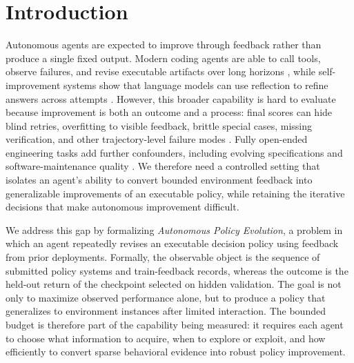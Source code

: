 \section{Introduction}
Autonomous agents are expected to improve through feedback rather than produce a single fixed output. Modern coding agents are able to call tools, observe failures, and revise executable artifacts over long horizons \citep{sweagent,openhands,codeact}, while self-improvement systems show that language models can use reflection to refine answers across attempts \citep{reflexion,selfrefine,alphaevolve}. However, this broader capability is hard to evaluate because improvement is both an outcome and a process: final scores can hide blind retries, overfitting to visible feedback, brittle special cases, missing verification, and other trajectory-level failure modes \citep{agentlens,codeagentbehavior,howcodingagentsfail}. 
Fully open-ended engineering tasks add further confounders, including evolving specifications and software-maintenance quality \citep{sweci,roadmapbench,specbench,slopcodebench}. 
We therefore need a controlled setting that isolates an agent's ability to convert bounded environment feedback into generalizable improvements of an executable policy, while retaining the iterative decisions that make autonomous improvement difficult.

We address this gap by formalizing \emph{Autonomous Policy Evolution}, a problem in which an agent repeatedly revises an executable decision policy using feedback from prior deployments. 
Formally, the observable object is the sequence of submitted policy systems and train-feedback records, whereas the outcome is the held-out return of the checkpoint selected on hidden validation.
The goal is not only to maximize observed performance alone, but to produce a policy that generalizes to environment instances after limited interaction. 
The bounded budget is therefore part of the capability being measured: it requires each agent to choose what information to acquire, when to explore or exploit, and how efficiently to convert sparse behavioral evidence into robust policy improvement.

